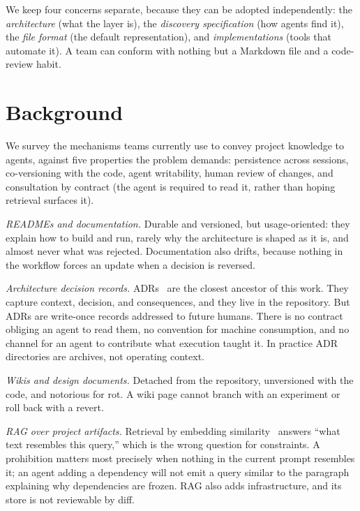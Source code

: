 \documentclass[sigconf,nonacm]{acmart}
\begin{document}
We keep four concerns separate, because they can be adopted independently: the
\emph{architecture} (what the layer is), the \emph{discovery specification} (how
agents find it), the \emph{file format} (the default representation), and
\emph{implementations} (tools that automate it). A team can conform with nothing
but a Markdown file and a code-review habit.

\section{Background}\label{sec:background}
We survey the mechanisms teams currently use to convey project knowledge to
agents, against five properties the problem demands: persistence across sessions,
co-versioning with the code, agent writability, human review of changes, and
consultation by contract (the agent is required to read it, rather than hoping
retrieval surfaces it).

\emph{READMEs and documentation.} Durable and versioned, but usage-oriented: they
explain how to build and run, rarely why the architecture is shaped as it is, and
almost never what was rejected. Documentation also drifts, because nothing in the
workflow forces an update when a decision is reversed.

\emph{Architecture decision records.} ADRs~\cite{nygard2011adr} are the closest
ancestor of this work. They capture context, decision, and consequences, and they
live in the repository. But ADRs are write-once records addressed to future
humans. There is no contract obliging an agent to read them, no convention for
machine consumption, and no channel for an agent to contribute what execution
taught it. In practice ADR directories are archives, not operating context.

\emph{Wikis and design documents.} Detached from the repository, unversioned with
the code, and notorious for rot. A wiki page cannot branch with an experiment or
roll back with a revert.

\emph{RAG over project artifacts.} Retrieval by embedding
similarity~\cite{lewis2020rag} answers ``what text resembles this query,'' which
is the wrong question for constraints. A prohibition matters most precisely when
nothing in the current prompt resembles it; an agent adding a dependency will not
emit a query similar to the paragraph explaining why dependencies are frozen. RAG
also adds infrastructure, and its store is not reviewable by diff.
\end{document}
